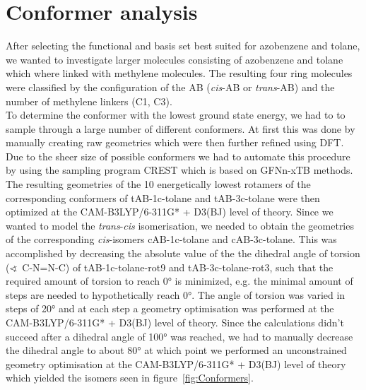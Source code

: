 \section{Conformer analysis}
%
After selecting the functional and basis set best suited for azobenzene and tolane, we wanted to investigate larger molecules consisting of azobenzene and tolane which where linked with methylene molecules. 
The resulting four ring molecules were classified by the configuration of the AB (\textit{cis}-AB or \textit{trans}-AB) and the number of methylene linkers (C1, C3). \\
To determine the conformer with the lowest ground state energy, we had to to sample through a large number of different conformers. 
At first this was done by manually creating raw geometries which were then further refined using DFT. 
Due to the sheer size of possible conformers we had to automate this procedure by using the sampling program CREST which is based on GFNn-xTB methods.\cite{crest} 
The resulting geometries of the 10 energetically lowest rotamers of the corresponding conformers of tAB-1c-tolane and tAB-3c-tolane were then optimized at the CAM-B3LYP/6-311G* + D3(BJ) level of theory.
Since we wanted to model the \textit{trans}-\textit{cis} isomerisation, we needed to obtain the geometries of the corresponding \textit{cis}-isomers cAB-1c-tolane and cAB-3c-tolane.
This was accomplished by decreasing the absolute value of the the dihedral angle of torsion (∢~C-N=N-C) of tAB-1c-tolane-rot9 and tAB-3c-tolane-rot3, such that the required amount of torsion to reach 0\si{\degree} is minimized,
e.g. the minimal amount of steps are needed to hypothetically reach 0\si[]{\degree}.
The angle of torsion was varied in steps of 20\si{\degree} and at each step a geometry optimisation was performed at the CAM-B3LYP/6-311G* + D3(BJ) level of theory.
Since the calculations didn't succeed after a dihedral angle of 100\si[]{\degree} was reached, 
we had to manually decrease the dihedral angle to about 80\si[]{\degree} at which point we performed an unconstrained geometry optimisation at the CAM-B3LYP/6-311G* + D3(BJ) level of theory which yielded the isomers seen in figure~\ref{fig:Conformers}.
%
%

